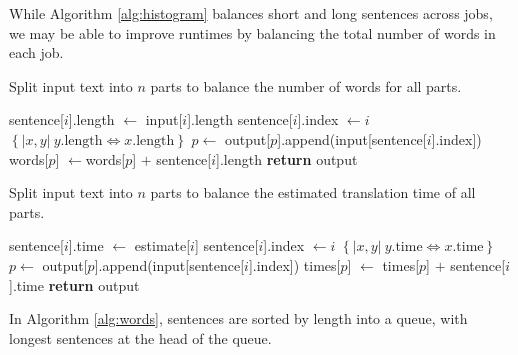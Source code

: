 \documentclass{pbml}
\begin{document}
While Algorithm \ref{alg:histogram} balances short and long sentences across jobs, we may be able to improve runtimes by 
balancing the total number of words in each job. 
\begin{algorithm}
\caption{Split input text into $n$ parts to balance the number of words for all parts.}
\begin{algorithmic}
\State sentence[$i$].length $\gets$ input[$i$].length
\State sentence[$i$].index $\gets i$
\EndFor
\State {} $\left\{|x,y|\ y.\mbox{length}\Leftrightarrow x.\mbox{length}\right\}$ 
\State {}
\State $p \gets$ 
\State {}
\State output[$p$].append(input[sentence[$i$].index])
\State words[$p$] $\gets$\hspace{0em}words[$p$] $+$ sentence[$i$].length%
\EndFor
\State \textbf{return} output
\EndFunction
\end{algorithmic}
\label{alg:words}
\end{algorithm}
%
%
\begin{algorithm}
\caption{Split input text into $n$ parts to balance the estimated translation time of all parts.}
\begin{algorithmic}
\State sentence[$i$].time $\gets$ estimate[$i$]
\State sentence[$i$].index $\gets i$
\EndFor
\State {} $\left\{|x,y|\ y.\mbox{time}\Leftrightarrow x.\mbox{time}\right\}$ 
\State {}
\State $p \gets$ 
\State {}
\State output[$p$].append(input[sentence[$i$].index])
\State times[$p$] $\gets$ times[$p$] $ + $ sentence[$i$].time
\EndFor
\State \textbf{return} output
\EndFunction
\end{algorithmic}
\label{alg:times}
\end{algorithm}
%
%
In Algorithm \ref{alg:words}, sentences are sorted by length into a queue, with longest sentences at the head of the queue.
\end{document}
